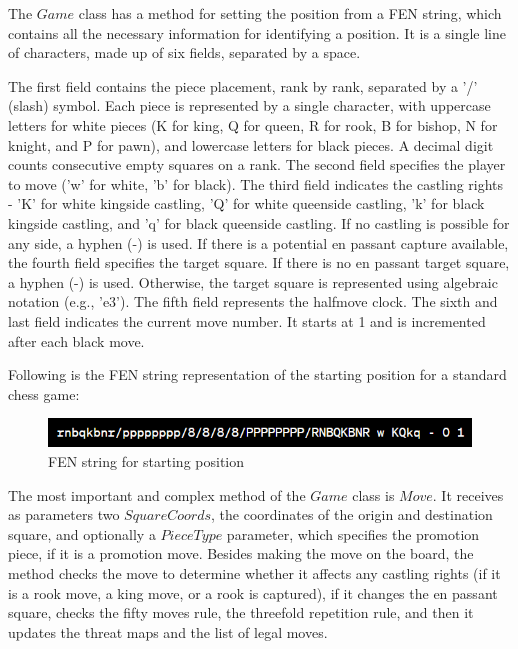 The $Game$ class has a method for setting the position from a FEN string, which contains all the necessary information for identifying a position. It is a single line of characters, made up of six fields, separated by a space.

The first field contains the piece placement, rank by rank, separated by a '/' (slash) symbol. Each piece is represented by a single character, with uppercase letters for white pieces (K for king, Q for queen, R for rook, B for bishop, N for knight, and P for pawn), and lowercase letters for black pieces. A decimal digit counts consecutive empty squares on a rank. The second field specifies the player to move ('w' for white, 'b' for black). The third field indicates the castling rights - 'K' for white kingside castling, 'Q' for white queenside castling, 'k' for black kingside castling, and 'q' for black queenside castling. If no castling is possible for any side, a hyphen (-) is used. If there is a potential en passant capture available, the fourth field specifies the target square. If there is no en passant target square, a hyphen (-) is used. Otherwise, the target square is represented using algebraic notation (e.g., 'e3'). The fifth field represents the halfmove clock. The sixth and last field indicates the current move number. It starts at 1 and is incremented after each black move.

Following is the FEN string representation of the starting position for a standard chess game:

\begin{figure}[h]
    \centering
    \includegraphics[width=1\textwidth]{figures/starting-position-fen.png}
    \caption{FEN string for starting position}
    \label{fig:fenStartingPosition}
\end{figure}

The most important and complex method of the $Game$ class is $Move$. It receives as parameters two $SquareCoords$, the coordinates of the origin and destination square, and optionally a $PieceType$ parameter, which specifies the promotion piece, if it is a promotion move. Besides making the move on the board, the method checks the move to determine whether it affects any castling rights (if it is a rook move, a king move, or a rook is captured), if it changes the en passant square, checks the fifty moves rule, the threefold repetition rule, and then it updates the threat maps and the list of legal moves.

